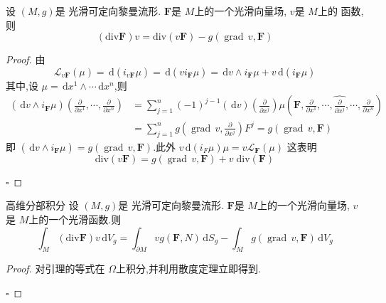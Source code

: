 \documentclass[../../main.tex]{subfiles}
\begin{document}
\begin{lemma}
     设 \(  \left( M,g \right)   \)是 光滑可定向黎曼流形. \(  \mathbf{F}  \)是 \(  M  \)上的一个光滑向量场, \(  v  \)是 \(  M  \)上的 函数,则 \[
    \left( \mathrm{div}  \mathbf{F} \right)v= \mathrm{div}\left( v \mathbf{F} \right)-g\left( \operatorname{grad}\,v, \mathbf{F} \right)   
    \]  
\end{lemma}
\begin{proof}
    由 \[
\mathcal{L}_{v \mathbf{F}}\left( \mu  \right)= \,\mathrm{d} \left( i_{v \mathbf{F}}\mu  \right)  = \,\mathrm{d} \left( v i _{\mathbf{F}}\mu  \right)= \,\mathrm{d} v\wedge  i_{\mathbf{F}}\mu+ v \,\mathrm{d} \left( i _{\mathbf{F}}\mu  \right)
\]  其中,设 \(  \mu = \,\mathrm{d} x^{1}\wedge \cdots \,\mathrm{d} x^{n}  \),则 \[
\begin{aligned}
\left( \,\mathrm{d} v\wedge i_{\mathbf{F}}\mu  \right)\left( \frac{\partial }{\partial x^{1}},\cdots ,\frac{\partial }{\partial x^{n}} \right)&= \sum _{j= 1}^{n}  \left( -1 \right)^{j-1} \left( \,\mathrm{d} v \right)\left( \frac{\partial }{\partial x^{j}} \right)\mu \left( \mathbf{F}, \frac{\partial }{\partial x^{1}},\cdots ,\hat{\frac{\partial }{\partial x^{j}}},\cdots ,\frac{\partial }{\partial x^{n}} \right)    \\ 
 &= \sum _{j= 1}^{n}g\left( \operatorname{grad}\,v, \frac{\partial }{\partial x^{j}} \right)F^{j}= g\left( \operatorname{grad}\,v,\mathbf{F} \right)   
\end{aligned}
\]  即 \(  \left( \,\mathrm{d} v\wedge i_{\mathbf{F}}\mu  \right)   = g\left( \operatorname{grad}\,v,\mathbf{F} \right) \).此外 \(  v\,\mathrm{d} \left( i_{F}\mu  \right)\mu = v \mathcal{L}_{ \mathbf{F}}\left( \mu  \right)    \)  这表明 \[
\mathrm{div}\left( v \mathbf{F} \right)=  g\left( \operatorname{grad}\,v,\mathbf{F} \right) +  v \;\mathrm{div}\left( \mathbf{F} \right) 
\]

    \hfill $\square$
\end{proof}
\begin{theorem}{高维分部积分}
     设 \(  \left( M,g \right)   \)是 光滑可定向黎曼流形. \(  \mathbf{F}  \)是 \(  M  \)上的一个光滑向量场,  \(  v  \)是 \(  M  \)上的一个光滑函数.则 \[
     \int_{M}\left( \mathrm{div} \mathbf{F} \right)v \,\mathrm{d} V_{g}= \int_{ \partial M}v g\left( \mathbf{F},N \right)\,\mathrm{d} S_{g}- \int_{  M}g\left( \operatorname{grad}\,v, \mathbf{F} \right)\,\mathrm{d} V_{g}   
     \]  
\end{theorem}

\begin{proof}
    对引理的等式在 \(   \Omega   \)上积分,并利用散度定理立即得到. 

    \hfill $\square$
\end{proof}
\end{document}
